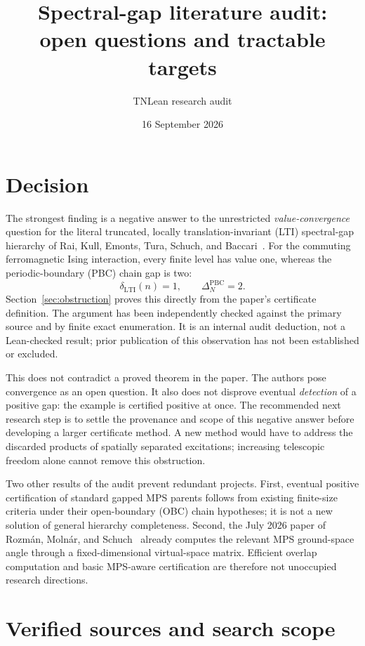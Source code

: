 \documentclass{article}
\title{Spectral-gap literature audit:\\open questions and tractable targets}
\author{TNLean research audit}
\date{16 September 2026}
\begin{document}
\maketitle

\section{Decision}

The strongest finding is a negative answer to the unrestricted
\emph{value-convergence} question for the literal truncated,
locally translation-invariant (LTI) spectral-gap hierarchy of Rai, Kull,
Emonts, Tura, Schuch, and Baccari~\cite{LTI}.
For the commuting ferromagnetic Ising interaction, every finite level has
value one, whereas the periodic-boundary (PBC) chain gap is two:
\begin{equation}
  \delta_{\mathrm{LTI}}(n)=1,
  \qquad \Delta_N^{\mathrm{PBC}}=2.
  \label{eq:verdict}
\end{equation}
Section~\ref{sec:obstruction} proves this directly from the paper's
certificate definition. The argument has been independently checked
against the primary source and by finite exact enumeration. It is an
internal audit deduction, not a Lean-checked result; prior publication
of this observation has not been established or excluded.

This does not contradict a proved theorem in the paper. The authors pose
convergence as an open question. It also does not disprove eventual
\emph{detection} of a positive gap: the example is certified positive at
once. The recommended next research step is to settle the provenance and
scope of this negative answer before developing a larger certificate
method. A new method would have to address the discarded products of
spatially separated excitations; increasing telescopic freedom alone
cannot remove this obstruction.

Two other results of the audit prevent redundant projects. First, eventual
positive certification of standard gapped MPS parents follows from existing
finite-size criteria under their open-boundary (OBC) chain hypotheses; it is not a new
solution of general hierarchy completeness. Second, the July 2026 paper
of Rozm\'an, Moln\'ar, and Schuch~\cite{RMS} already computes the relevant
MPS ground-space angle through a fixed-dimensional virtual-space matrix.
Efficient overlap computation and basic MPS-aware certification are
therefore not unoccupied research directions.

\section{Verified sources and search scope}
\label{sec:sources}
\end{document}
